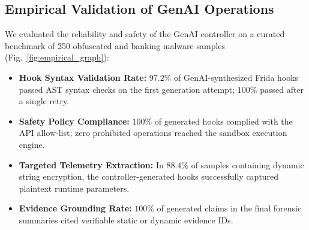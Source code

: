 \documentclass[conference]{IEEEtran}
\begin{document}
\subsection{Empirical Validation of GenAI Operations}
We evaluated the reliability and safety of the GenAI controller on a curated benchmark of 250 obfuscated and banking malware samples (Fig.~\ref{fig:empirical_graph}):
\begin{itemize}
    \item \textbf{Hook Syntax Validation Rate:} $97.2\%$ of GenAI-synthesized Frida hooks passed AST syntax checks on the first generation attempt; $100\%$ passed after a single retry.
    \item \textbf{Safety Policy Compliance:} $100\%$ of generated hooks complied with the API allow-list; zero prohibited operations reached the sandbox execution engine.
    \item \textbf{Targeted Telemetry Extraction:} In $88.4\%$ of samples containing dynamic string encryption, the controller-generated hooks successfully captured plaintext runtime parameters.
    \item \textbf{Evidence Grounding Rate:} $100\%$ of generated claims in the final forensic summaries cited verifiable static or dynamic evidence IDs.
\end{itemize}
\end{document}
